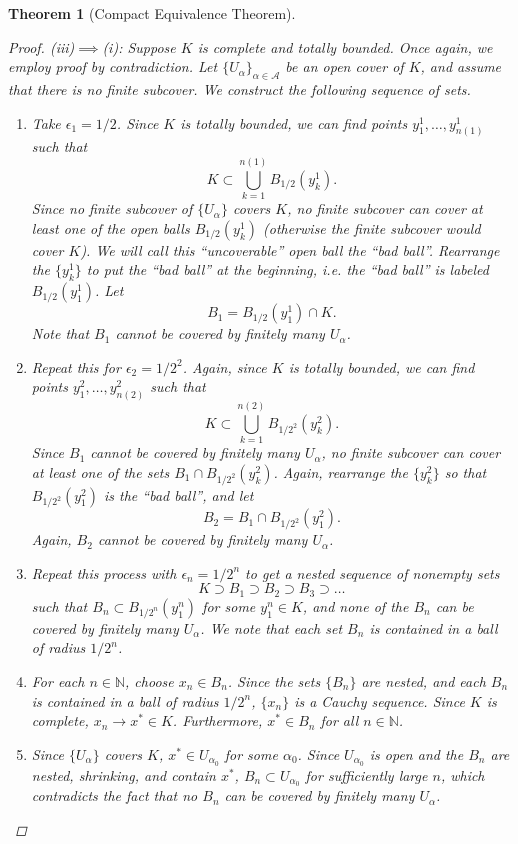 \documentclass[12pt]{amsart}         %
\newtheorem{theorem}{Theorem}[section]
\theoremstyle{remark}
\newcommand{\N}{\mathbb{N}}
\begin{document}
\begin{theorem}[Compact Equivalence Theorem]
\begin{proof}
(iii)$\implies$(i): Suppose $K$ is complete and totally bounded. Once again, we employ proof by contradiction. Let $\{U_\alpha\}_{\alpha \in \mathcal{A}}$ be an open cover of $K$, and assume that there is no finite subcover. We construct the following sequence of sets.
\begin{enumerate}
\item Take $\epsilon_1 = 1/2$. Since $K$ is totally bounded, we can find points $y_1^1, \dots, y_{n(1)}^1$ such that
\[
K \subset \bigcup_{k=1}^{n(1)} B_{1/2}(y_k^1).
\]
Since no finite subcover of $\{U_\alpha\}$ covers $K$, no finite subcover can cover at least one of the open balls $B_{1/2}(y_k^1)$ (otherwise the finite subcover would cover $K$). We will call this ``uncoverable'' open ball the ``bad ball''. Rearrange the $\{y_k^1\}$ to put the ``bad ball'' at the beginning, i.e. the ``bad ball'' is labeled $B_{1/2}(y_1^1)$. Let
\[
B_1 = B_{1/2}(y_1^1) \cap K.
\]
Note that $B_1$ cannot be covered by finitely many $U_\alpha$.
\item Repeat this for $\epsilon_2 = 1/2^2$. Again, since $K$ is totally bounded, we can find points $y_1^2, \dots, y_{n(2)}^2$ such that
\[
K \subset \bigcup_{k=1}^{n(2)} B_{1/2^2}(y_k^2).
\]
Since $B_1$ cannot be covered by finitely many $U_\alpha$, no finite subcover can cover at least one of the sets $B_1 \cap B_{1/2^2}(y_k^2)$. Again, rearrange the $\{y_k^2\}$ so that $B_{1/2^2}(y_1^2)$ is the ``bad ball'', and let
\[
B_2 = B_1 \cap B_{1/2^2}(y_1^2).
\]
Again, $B_2$ cannot be covered by finitely many $U_\alpha$.
\item Repeat this process with $\epsilon_n = 1/2^n$ to get a nested sequence of nonempty sets
\[
K \supset B_1 \supset B_2 \supset B_3 \supset \dots
\]
such that $B_n \subset B_{1/2^n}(y_1^n)$ for some $y_1^n \in K$, and none of the $B_n$ can be covered by finitely many $U_\alpha$. We note that each set $B_n$ is contained in a ball of radius $1/2^n$.
\item For each $n \in \N$, choose $x_n \in B_n$. Since the sets $\{B_n\}$ are nested, and each $B_n$ is contained in a ball of radius $1/2^n$, $\{x_n\}$ is a Cauchy sequence. Since $K$ is complete, $x_n \rightarrow x^* \in K$. Furthermore, $x^* \in B_n$ for all $n \in \N$.
\item Since $\{U_\alpha\}$ covers $K$, $x^* \in U_{\alpha_0}$ for some $\alpha_0$. Since $U_{\alpha_0}$ is open and the $B_n$ are nested, shrinking, and contain $x^*$, $B_n \subset U_{\alpha_0}$ for sufficiently large $n$, which contradicts the fact that no $B_n$ can be covered by finitely many $U_\alpha$.
\end{enumerate}
\end{proof}
\end{theorem}
\end{document}
